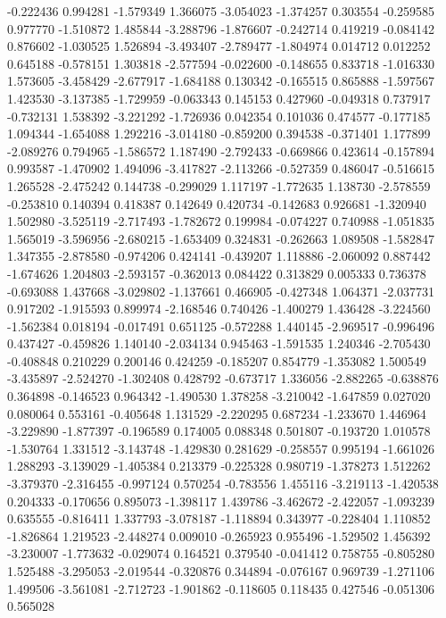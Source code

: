 -0.222436
0.994281
-1.579349
1.366075
-3.054023
-1.374257
0.303554
-0.259585
0.977770
-1.510872
1.485844
-3.288796
-1.876607
-0.242714
0.419219
-0.084142
0.876602
-1.030525
1.526894
-3.493407
-2.789477
-1.804974
0.014712
0.012252
0.645188
-0.578151
1.303818
-2.577594
-0.022600
-0.148655
0.833718
-1.016330
1.573605
-3.458429
-2.677917
-1.684188
0.130342
-0.165515
0.865888
-1.597567
1.423530
-3.137385
-1.729959
-0.063343
0.145153
0.427960
-0.049318
0.737917
-0.732131
1.538392
-3.221292
-1.726936
0.042354
0.101036
0.474577
-0.177185
1.094344
-1.654088
1.292216
-3.014180
-0.859200
0.394538
-0.371401
1.177899
-2.089276
0.794965
-1.586572
1.187490
-2.792433
-0.669866
0.423614
-0.157894
0.993587
-1.470902
1.494096
-3.417827
-2.113266
-0.527359
0.486047
-0.516615
1.265528
-2.475242
0.144738
-0.299029
1.117197
-1.772635
1.138730
-2.578559
-0.253810
0.140394
0.418387
0.142649
0.420734
-0.142683
0.926681
-1.320940
1.502980
-3.525119
-2.717493
-1.782672
0.199984
-0.074227
0.740988
-1.051835
1.565019
-3.596956
-2.680215
-1.653409
0.324831
-0.262663
1.089508
-1.582847
1.347355
-2.878580
-0.974206
0.424141
-0.439207
1.118886
-2.060092
0.887442
-1.674626
1.204803
-2.593157
-0.362013
0.084422
0.313829
0.005333
0.736378
-0.693088
1.437668
-3.029802
-1.137661
0.466905
-0.427348
1.064371
-2.037731
0.917202
-1.915593
0.899974
-2.168546
0.740426
-1.400279
1.436428
-3.224560
-1.562384
0.018194
-0.017491
0.651125
-0.572288
1.440145
-2.969517
-0.996496
0.437427
-0.459826
1.140140
-2.034134
0.945463
-1.591535
1.240346
-2.705430
-0.408848
0.210229
0.200146
0.424259
-0.185207
0.854779
-1.353082
1.500549
-3.435897
-2.524270
-1.302408
0.428792
-0.673717
1.336056
-2.882265
-0.638876
0.364898
-0.146523
0.964342
-1.490530
1.378258
-3.210042
-1.647859
0.027020
0.080064
0.553161
-0.405648
1.131529
-2.220295
0.687234
-1.233670
1.446964
-3.229890
-1.877397
-0.196589
0.174005
0.088348
0.501807
-0.193720
1.010578
-1.530764
1.331512
-3.143748
-1.429830
0.281629
-0.258557
0.995194
-1.661026
1.288293
-3.139029
-1.405384
0.213379
-0.225328
0.980719
-1.378273
1.512262
-3.379370
-2.316455
-0.997124
0.570254
-0.783556
1.455116
-3.219113
-1.420538
0.204333
-0.170656
0.895073
-1.398117
1.439786
-3.462672
-2.422057
-1.093239
0.635555
-0.816411
1.337793
-3.078187
-1.118894
0.343977
-0.228404
1.110852
-1.826864
1.219523
-2.448274
0.009010
-0.265923
0.955496
-1.529502
1.456392
-3.230007
-1.773632
-0.029074
0.164521
0.379540
-0.041412
0.758755
-0.805280
1.525488
-3.295053
-2.019544
-0.320876
0.344894
-0.076167
0.969739
-1.271106
1.499506
-3.561081
-2.712723
-1.901862
-0.118605
0.118435
0.427546
-0.051306
0.565028
